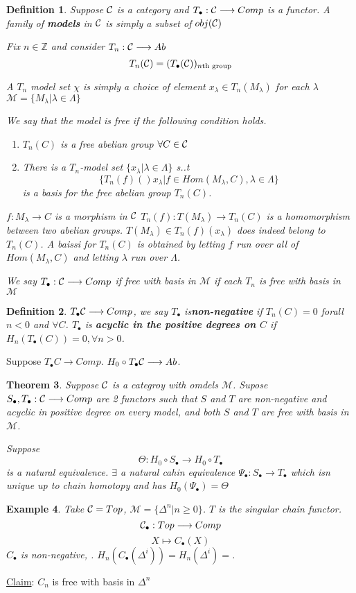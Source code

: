 \documentclass[11pt]{article}
\newtheorem{thm}{Theorem}[section]
\newtheorem{dfn}[thm]{Definition}
\newtheorem{ex}[thm]{Example}
\newcommand{\intg}{\mathbb Z}
\newcommand{\calc}{{\cal C}}
\newcommand{\lrta}{\longrightarrow}
\begin{document}
\begin{dfn}
Suppose $\calc$ is a category and $T_\bullet:\calc\lrta Comp$ is a functor. A family of \textbf{models} in $\calc$ is simply a subset of $obj(\calc)$

Fix $n\in \intg$ and consider  $T_n:\calc\lrta Ab$
$$
T_n(\calc)=(T_\bullet(\calc))_{n \text{th group}}
$$

A $T_n$ model set $\chi$ is simply a choice of element $x_\lambda\in T_n(M_\lambda)$ for each $\lambda$ $\mathcal{M}=\{M_\lambda|\lambda\in \Lambda\}$

We say that the model is free if the following condition holds.
\begin{enumerate}
\item $T_n(C)$ is a free abelian group $\forall C\in \calc$
\item There is a $T_n$-model set $\{x_\lambda|\lambda\in \Lambda\}$ s..t
$$
\{T_n(f)()x_\lambda|f\in Hom(M_\lambda,C), \lambda\in \Lambda\}
$$
is a basis for the free abelian group $T_n(C)$.
\end{enumerate}
$f: M_\lambda\lrta C$ is a  morphism in $\calc$ $T_n (f): T(M_\lambda)\lrta T_n(C)$ is a  homomorphism between two abelian groups. $T(M_\lambda)\in T_n(f)(x_\lambda)$ does indeed belong to $T_n(C)$. A baissi for $T_n(C)$ is obtained by letting $f$ run over all of $Hom(M_\lambda, C)$ and letting $\lambda$ run over $\Lambda$. 

We say $T_\bullet:\calc\lrta Comp$ if free with basis in $\mathcal{M}$ if each $T_n$ is free with basis in $\mathcal{M}$
\end{dfn}

\begin{dfn}
$T_\bullet\calc\lrta Comp$, we say $T_\bullet$ is\textbf{non-negative} if $T_n(C)=0$ forall $n<0$ and $\forall C$. $T_\bullet$ is \textbf{acyclic in the positive degrees on $C$} if $H_n(T_\bullet(C))=0,\forall n>0$. 
\end{dfn}
Suppose $T_\bullet C\lrta Comp$. $H_0\circ T_\bullet \calc\lrta Ab$.
\begin{thm}
Suppose $\calc$ is a categroy with omdels $\mathcal{M}$. Supose $S_\bullet, T_\bullet:\calc\lrta Comp$ are 2 functors such that $S$ and $T$ are non-negative and acyclic in positive degree on every model, and 
both $S$ and $T$ are free with basis in $\mathcal{M}$.

Suppose 
$$
\Theta: H_0\circ S_\bullet\lrta H_0\circ T_\bullet
$$
 is a natural equivalence. $\exists $ a  natural cahin equivalence $\Psi_\bullet:S_\bullet\lrta T_\bullet$ which isn unique up to chain homotopy and has $H_0(\Psi_\bullet)=\Theta$
\end{thm}
\begin{ex}
Take $\calc=Top$, $\mathcal{M}=\{\Delta^n|n\geq 0\}$.  $T$ is the singular chain functor.
$$
\calc_\bullet: Top\lrta Comp
$$
$$
X\mapsto C_\bullet(X)
$$
$C_\bullet$ is non-negative, \checkmark.
$H_n(C_\bullet(\Delta^i))=H_n(\Delta^i)=$.


\end{ex}
\underline{Claim}: $C_n$ is free with basis in $\Delta^n$
\end{document}

